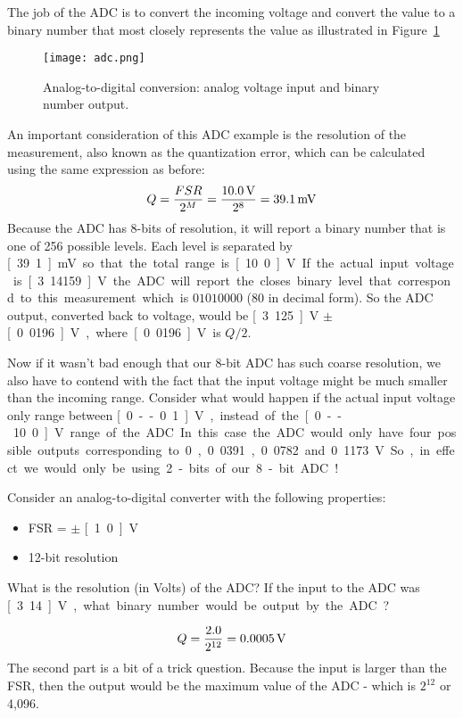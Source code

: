 The job of the ADC is to convert the incoming voltage and convert the value to a binary number that most closely represents the value as illustrated in Figure~\ref{f:adc}
\begin{figure}[hbt!]
\centering
\texttt{[image: adc.png]}
\caption{Analog-to-digital conversion: analog voltage input and binary number output.}
\label{f:adc}
\end{figure}
An important consideration of this ADC example is the resolution of the measurement, also known as the quantization error, which can be calculated using the same expression as before:
\begin{equation}
Q = \frac{FSR}{2^M} = \frac{\unit[10.0]{V}}{2^8} = \unit[39.1]{mV}
\end{equation}
Because the ADC has 8-bits of resolution, it will report a binary number that is one of 256 possible levels.  Each level is separated by \unit[39.1]{mV} so that the total range is \unit[10.0]{V}.  If the actual input voltage is \unit[3.14159]{V} the ADC will report the closes binary level that correspond to this measurement which is $01010000$ (80 in decimal form).  So the ADC output, converted back to voltage, would be \unit[3.125]{V} $\pm$ \unit[0.0196]{V}, where \unit[0.0196]{V} is $Q/2$.  

Now if it wasn't bad enough that our 8-bit ADC has such coarse resolution, we also have to contend with the fact that the input voltage might be much smaller than the incoming range.  Consider what would happen if the actual input voltage only range between \unit[0--0.1]{V}, instead of the \unit[0--10.0]{V} range of the ADC.  In this case the ADC would only have four possible outputs corresponding to 0, 0.0391, 0.0782 and 0.1173 V.  So, in effect we would only be using 2-bits of our 8-bit ADC!

\begin{ex}
Consider an analog-to-digital converter with the following properties:
\begin{itemize}
\item FSR = $\pm$ \unit[1.0]{V}
\item 12-bit resolution
\end{itemize}
What is the resolution (in Volts) of the ADC?  If the input to the ADC was \unit[3.14]{V}, what binary number would be output by the ADC?
\end{ex}

\ifsolutions
\begin{soln}
\[ 
Q = \frac{2.0}{2^{12}} = \unit[0.0005]{V}
\]
The second part is a bit of a trick question.  Because the input is larger than the FSR, then the output would be the maximum value of the ADC - which is $2^{12}$ or 4,096.  
\end{soln}
\fi

